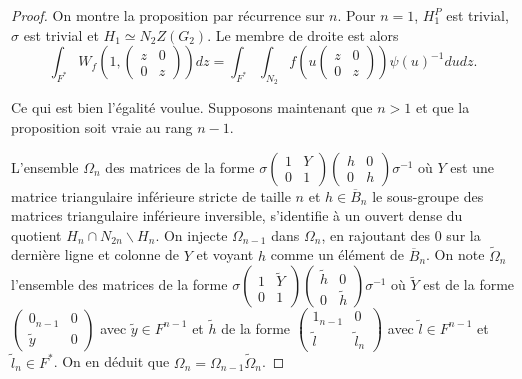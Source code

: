 \documentclass{amsart}
\begin{document}
\begin{proof}
On montre la proposition par récurrence sur $n$. Pour $n=1$, $H^P_1$ est trivial, $\sigma$ est trivial et $H_1 \simeq N_2 Z(G_2)$. Le membre de droite est alors
\begin{equation}
\int_{F^*} W_f \left(1, \begin{pmatrix}
z & 0 \\
0 & z
\end{pmatrix} \right) dz = \int_{F^*} \int_{N_2} f \left(u\begin{pmatrix}
z & 0 \\
0 & z
\end{pmatrix} \right) \psi(u)^{-1} du dz.
\end{equation}

Ce qui est bien l'égalité voulue. Supposons maintenant que $n > 1$ et que la proposition soit vraie au rang $n-1$.

L'ensemble $\Omega_n$ des matrices de la forme
$\sigma \begin{pmatrix}
1 & Y \\
0 & 1
\end{pmatrix}\begin{pmatrix}
h & 0 \\
0 & h
\end{pmatrix} \sigma^{-1}$ où $Y$ est une matrice triangulaire inférieure stricte de taille $n$ et $h \in \overline{B}_n$ le sous-groupe des matrices triangulaire inférieure inversible, s'identifie à un ouvert dense du quotient $H_n \cap N_{2n} \backslash{H_n}$. On injecte $\Omega_{n-1}$ dans $\Omega_n$, en rajoutant des 0 sur la dernière ligne et colonne de $Y$ et voyant $h$ comme un élément de $\overline{B}_n$. On note $\widetilde{\Omega}_n$ l'ensemble des matrices de la
forme $\sigma \begin{pmatrix}
1 & \widetilde{Y} \\
0 & 1
\end{pmatrix}\begin{pmatrix}
\widetilde{h} & 0 \\
0 & \widetilde{h}
\end{pmatrix} \sigma^{-1}$
où $\widetilde{Y}$ est de la forme $\begin{pmatrix}
0_{n-1} & 0 \\
\widetilde{y} & 0
\end{pmatrix}$ avec $\widetilde{y} \in F^{n-1}$ et $\widetilde{h}$ de la forme $\begin{pmatrix}
1_{n-1} & 0 \\
\widetilde{l} & \widetilde{l}_n
\end{pmatrix}$ avec $\widetilde{l} \in F^{n-1}$ et $\widetilde{l}_n \in F^*$. On en déduit que $\Omega_n = \Omega_{n-1} \widetilde{\Omega}_n$. 


\end{proof}
\end{document}
